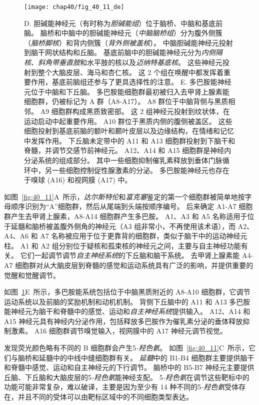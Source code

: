 \begin{figure}[htbp]
	\centering
	\texttt{[image: chap40/fig\_40\_11\_de]}
	\caption{D. 胆碱能神经元（有时称为\textit{胆碱能组}）位于脑桥、中脑和基底前脑。
		脑桥和中脑中的胆碱能神经元（\textit{中脑脑桥组}）分为腹外侧簇（\textit{脑桥脚核}）和背内侧簇（\textit{背外侧被盖核}）。
		中脑胆碱能神经元投射到脑干网状结构和丘脑。
		基底前脑中的胆碱能神经元分为\textit{内侧隔核}、\textit{斜角带垂直肢}和水平肢的核以及\textit{迈纳特基底核}。
		这些神经元投射到整个大脑皮层、海马和杏仁核。
		这 2 个组在唤醒中都发挥着重要作用，基底前脑组还参与了更具选择性的注意。
		E. 多巴胺能神经元位于中脑和下丘脑。
		多巴胺能细胞群最初被归入去甲肾上腺素能细胞群，仍被标记为 A 群（A8-A17）。
		A8 群位于中脑背侧与黑质相邻。
		A9 细胞群构成黑质致密部。
		这 2 组神经元投射到纹状体，在运动启动中起重要作用。
		A10 群位于黑质内侧的腹侧被盖区。
		这些细胞投射到基底前脑的额叶和颞叶皮层以及边缘结构，在情绪和记忆中发挥作用。
		下丘脑未定带中的 A11 和 A13 细胞群投射到下脑干和脊髓，并调节交感节前神经元。
		A12、A14 和 A15 细胞群是神经内分泌系统的组成部分。
		其中一些细胞抑制催乳素释放到垂体门脉循环中，另一些细胞控制促性腺激素的分泌。
		多巴胺能神经元也存在于嗅球 (A16) 和视网膜 (A17) 中。}
	\label{fig:40_11_de}
\end{figure}


如图~\ref{fig:40_11}A~所示，\textit{达尔斯特伦}和\textit{富克塞}鉴定的第一个细胞群被简单地按字母顺序识别为“A”细胞群，然后从尾端到头端按顺序编号。
后来确定 A1-A7 细胞群产生去甲肾上腺素，A8-A14 细胞群产生多巴胺。
A1、A3 和 A5 名称适用于位于延髓和脑桥被盖腹外侧角的神经元（A3 组非常小，不再使用该术语），而 A2、A4、A6 和 A7 名称被应用于位于更靠背的细胞群，类似于脑干中的运动神经元柱。
A1 和 A2 组分别位于疑核和孤束核的神经元之间，主要与自主神经功能有关。
它们一起调节调节\textit{自主神经系统}的下丘脑和脑干系统。
去甲肾上腺素能 A4-A7 细胞群对从大脑皮层到脊髓的感觉和运动系统具有广泛的影响，并提供重要的觉醒和觉醒调节。


如图~\ref{fig:40_11_de}E~所示，多巴胺能系统包括位于中脑黑质附近的 A8-A10 细胞群，它调节运动系统以及前脑的奖励机制和动机机制。
背侧下丘脑中的 A11 和 A13 多巴胺能神经元为脑干和脊髓中的感觉、运动和\textit{自主神经系统}提供输入。
A12、A14 和 A15 神经元具有神经内分泌作用，包括释放多巴胺作为催乳素分泌的垂体释放抑制激素。
A16 细胞群调节嗅觉输入，视网膜中的 A17 神经元调节视觉。


发现荧光颜色略有不同的 B 细胞群会产生5\textit{-羟色氨}。
如图~\ref{fig:40_11}C~所示，它们与脑桥和延髓中的中线中缝细胞群有关。
\textit{延髓}中的 B1-B4 细胞群主要提供脑干和脊髓中感觉、运动和自主神经元的下行调节。
脑桥中的 B5-B7 神经元主要提供丘脑、下丘脑和大脑皮层的5\textit{-羟色氨}能神经支配。
5\textit{-羟色氨}在调节这些靶标中的功能可能非常复杂，难以破译，主要是因为至少有 14 种不同的5\textit{-羟色氨}受体存在，并且不同的受体可以由靶标区域中的不同细胞类型表达。


